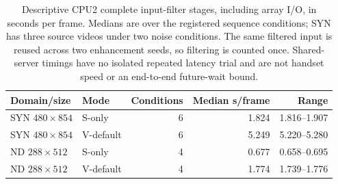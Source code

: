 \begin{table}[t]
\centering\small
\caption{Descriptive CPU2 complete input-filter stages, including array I/O, in seconds per frame. Medians are over the registered sequence conditions; SYN has three source videos under two noise conditions. The same filtered input is reused across two enhancement seeds, so filtering is counted once. Shared-server timings have no isolated repeated latency trial and are not handset speed or an end-to-end future-wait bound.}
\label{tab:classical-cost}
\begin{tabular}{llrrr}
\toprule
Domain/size & Mode & Conditions & Median s/frame & Range\\
\midrule
SYN $480\times854$ & S-only & 6 & 1.824 & 1.816--1.907\\
SYN $480\times854$ & V-default & 6 & 5.249 & 5.220--5.280\\
ND $288\times512$ & S-only & 4 & 0.677 & 0.658--0.695\\
ND $288\times512$ & V-default & 4 & 1.774 & 1.739--1.776\\
\bottomrule
\end{tabular}
\end{table}
